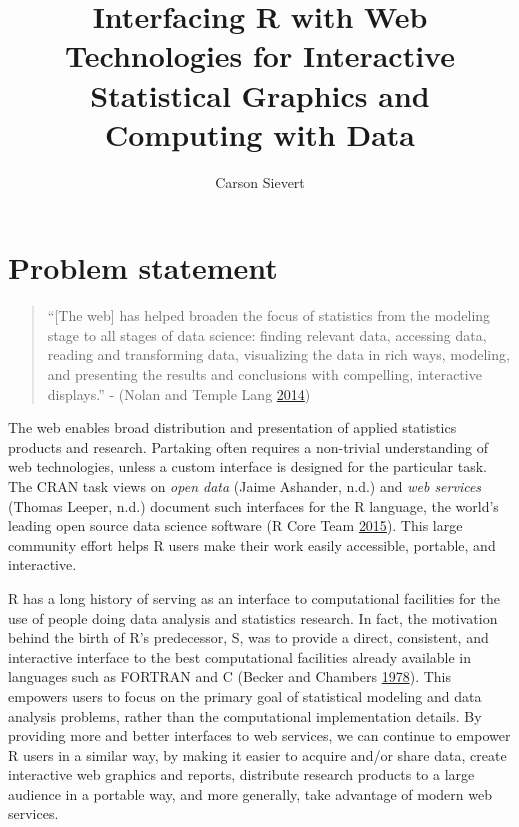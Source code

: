 \documentclass[12pt,]{isuthesis}
\title{Interfacing R with Web Technologies for Interactive Statistical Graphics
and Computing with Data}
\author{Carson Sievert}
\date{}
\begin{document}
\maketitle

{
\hypersetup{linkcolor=black}
\setcounter{tocdepth}{2}
\tableofcontents
}
\listoftables
\cleardoublepage {} {}
\listoffigures

\cleardoublepage {}

\newpage
{}
\chapter{Problem statement}

\begin{quote}
``{[}The web{]} has helped broaden the focus of statistics from the
modeling stage to all stages of data science: finding relevant data,
accessing data, reading and transforming data, visualizing the data in
rich ways, modeling, and presenting the results and conclusions with
compelling, interactive displays.'' - (Nolan and Temple Lang
\protect\hyperlink{ref-nolan-lang}{2014})
\end{quote}

The web enables broad distribution and presentation of applied
statistics products and research. Partaking often requires a non-trivial
understanding of web technologies, unless a custom interface is designed
for the particular task. The CRAN task views on \emph{open data} (Jaime
Ashander, n.d.) and \emph{web services} (Thomas Leeper, n.d.) document
such interfaces for the R language, the world's leading open source data
science software (R Core Team \protect\hyperlink{ref-RCore}{2015}). This
large community effort helps R users make their work easily accessible,
portable, and interactive.

R has a long history of serving as an interface to computational
facilities for the use of people doing data analysis and statistics
research. In fact, the motivation behind the birth of R's predecessor,
S, was to provide a direct, consistent, and interactive interface to the
best computational facilities already available in languages such as
FORTRAN and C (Becker and Chambers
\protect\hyperlink{ref-S:1978}{1978}). This empowers users to focus on
the primary goal of statistical modeling and data analysis problems,
rather than the computational implementation details. By providing more
and better interfaces to web services, we can continue to empower R
users in a similar way, by making it easier to acquire and/or share
data, create interactive web graphics and reports, distribute research
products to a large audience in a portable way, and more generally, take
advantage of modern web services.
\end{document}

